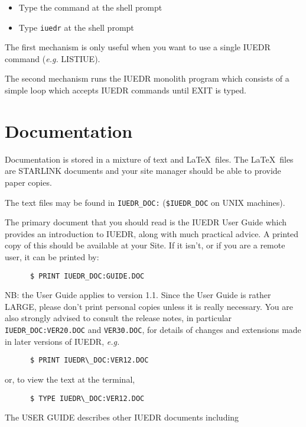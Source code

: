 \begin{itemize}
\item {Type the command at the shell prompt}
\item {Type {\tt iuedr} at the shell prompt}
\end{itemize}

The first mechanism is only useful when you want to use a single IUEDR
command ({\em e.g.} LISTIUE).

The second mechanism runs the IUEDR monolith program which consists of
a simple loop which accepts IUEDR commands until EXIT is typed.

\section {Documentation} 

Documentation is stored in a mixture of text and \LaTeX\ files. The
\LaTeX\ files are STARLINK documents and your site manager should be
able to provide paper copies.

The text files may be found in {\tt IUEDR\_DOC:} ({\tt \$IUEDR\_DOC}
on UNIX machines).

The primary document that you should read is the IUEDR User Guide
which provides an introduction to IUEDR, along with much practical
advice. A printed copy of this should be available at your Site. If it
isn't, or if you are a remote user, it can be printed by:

\begin{verbatim}
      $ PRINT IUEDR_DOC:GUIDE.DOC
\end{verbatim}

NB: the User Guide applies to version 1.1. Since the User Guide is
rather LARGE, please don't print personal copies unless it is really
necessary. You are also strongly  advised to consult the release
notes, in particular {\tt IUEDR\_DOC:VER20.DOC} and {\tt VER30.DOC},
for details of changes and extensions made  in later versions of
IUEDR, {\em e.g.}

\begin{verbatim}
      $ PRINT IUEDR\_DOC:VER12.DOC
\end{verbatim}

or, to view the text at the terminal,

\begin{verbatim}
      $ TYPE IUEDR\_DOC:VER12.DOC
\end{verbatim}

The USER GUIDE describes other IUEDR documents including

